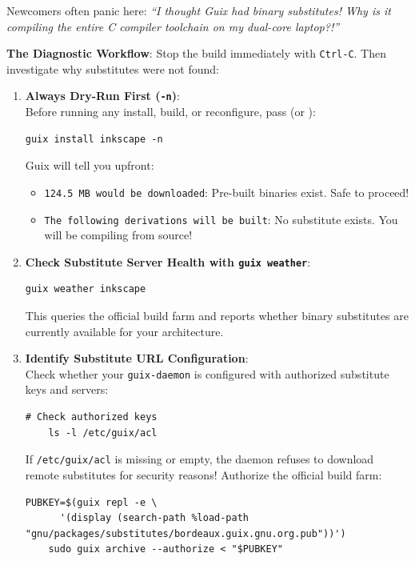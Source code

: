 \begin{footgunbox}
Newcomers often panic here: \emph{``I thought Guix had binary substitutes! Why is it compiling the entire C compiler toolchain on my dual-core laptop?!''}
\end{footgunbox}

\textbf{The Diagnostic Workflow}:
Stop the build immediately with \texttt{Ctrl-C}. Then investigate why substitutes were not found:

\begin{enumerate}
  \item \textbf{Always Dry-Run First (\texttt{-n})}:\\
    Before running any install, build, or reconfigure, pass  (or ):
    \begin{lstlisting}[style=guixcli]
    guix install inkscape -n
    \end{lstlisting}
    Guix will tell you upfront:
    \begin{itemize}
      \item \texttt{124.5 MB would be downloaded}: Pre-built binaries exist. Safe to proceed!
      \item \texttt{The following derivations will be built}: No substitute exists. You will be compiling from source!
    \end{itemize}

  \item \textbf{Check Substitute Server Health with \texttt{guix weather}}:\\
    \begin{lstlisting}[style=guixcli]
    guix weather inkscape
    \end{lstlisting}
    This queries the official build farm and reports whether binary substitutes are currently available for your architecture.

  \item \textbf{Identify Substitute URL Configuration}:\\
    Check whether your \texttt{guix-daemon} is configured with authorized substitute keys and servers:
    \begin{lstlisting}[style=guixcli]
    # Check authorized keys
    ls -l /etc/guix/acl
    \end{lstlisting}
    If \texttt{/etc/guix/acl} is missing or empty, the daemon refuses to download remote substitutes for security reasons! Authorize the official build farm:
    \begin{lstlisting}[style=guixcli]
    PUBKEY=$(guix repl -e \
      '(display (search-path %load-path "gnu/packages/substitutes/bordeaux.guix.gnu.org.pub"))')
    sudo guix archive --authorize < "$PUBKEY"
    \end{lstlisting}


\end{enumerate}
